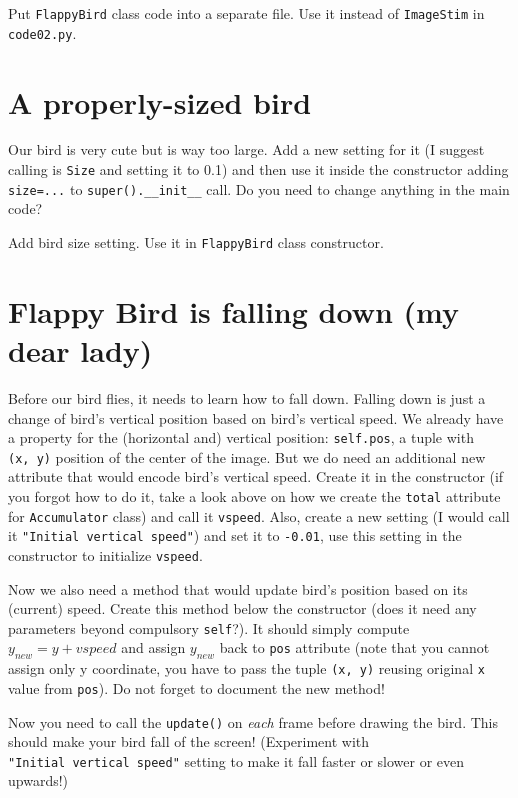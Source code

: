 \documentclass[
]{book}
\begin{document}
Put \texttt{FlappyBird} class code into a separate file.
Use it instead of \texttt{ImageStim} in \texttt{code02.py}.

\hypertarget{a-properly-sized-bird}{%
\section{A properly-sized bird}\label{a-properly-sized-bird}}

Our bird is very cute but is way too large. Add a new setting for it (I suggest calling is \texttt{Size} and setting it to 0.1) and then use it inside the constructor adding \texttt{size=...} to \texttt{super().\_\_init\_\_} call. Do you need to change anything in the main code?

Add bird size setting.
Use it in \texttt{FlappyBird} class constructor.

\hypertarget{flappy-bird-is-falling-down-my-dear-lady}{%
\section{Flappy Bird is falling down (my dear lady)}\label{flappy-bird-is-falling-down-my-dear-lady}}

Before our bird flies, it needs to learn how to fall down. Falling down is just a change of bird's vertical position based on bird's vertical speed. We already have a property for the (horizontal and) vertical position: \texttt{self.pos}, a tuple with \texttt{(x,\ y)} position of the center of the image. But we do need an additional new attribute that would encode bird's vertical speed. Create it in the constructor (if you forgot how to do it, take a look above on how we create the \texttt{total} attribute for \texttt{Accumulator} class) and call it \texttt{vspeed}. Also, create a new setting (I would call it \texttt{"Initial\ vertical\ speed"}) and set it to \texttt{-0.01}, use this setting in the constructor to initialize \texttt{vspeed}.

Now we also need a method that would update bird's position based on its (current) speed. Create this method below the constructor (does it need any parameters beyond compulsory \texttt{self}?). It should simply compute \(y_{new} = y + vspeed\) and assign \(y_{new}\) back to \texttt{pos} attribute (note that you cannot assign only y coordinate, you have to pass the tuple \texttt{(x,\ y)} reusing original \texttt{x} value from \texttt{pos}). Do not forget to document the new method!

Now you need to call the \texttt{update()} on \emph{each} frame before drawing the bird. This should make your bird fall of the screen! (Experiment with \texttt{"Initial\ vertical\ speed"} setting to make it fall faster or slower or even upwards!)
\end{document}
